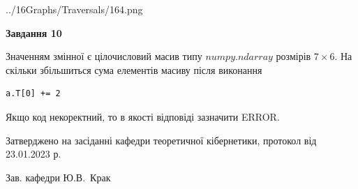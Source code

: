 \documentclass[12pt, ukrainian]{article}
\begin{document}
{\begin {large}
\begin{center}
	{../16Graphs/Traversals/164.png}
\end{center}\par
\newpage

{\begin {center}\textbf{Завдання 10}\end {center}}\par
Значенням змінної  є цілочисловий масив типу $numpy.ndarray$ розмірів $7{\times}6$. На скільки збільшиться сума елементів масиву  після виконання
\begin{verbatim}
a.T[0] += 2
\end{verbatim}


Якщо код некоректний, то в якості відповіді зазначити ERROR.\par
\newpage


\end {large}
}
{\smallskip \begin {small} Затверджено на засіданні кафедри теоретичної кібернетики, протокол  від   23.01.2023 р.\par\smallskip\smallskip
{\parbox {6.5 cm}{Зав. кафедри \dotfill Ю.В.~Крак}} \end{small}}
\end{document}
